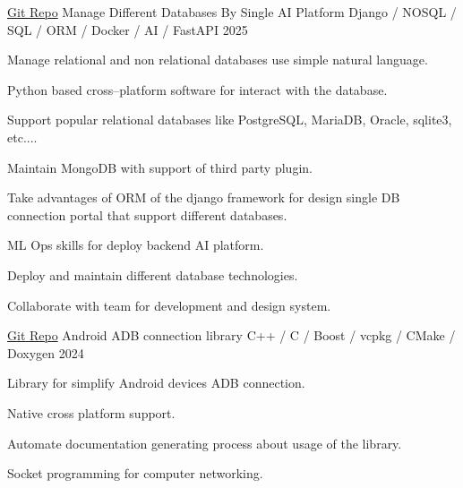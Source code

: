 

\begin{cventries}

  \cventry
    {\href{https://github.com/drsamitha/Demo_DBMS}{Git Repo}} %
    {Manage Different Databases By Single AI Platform} %
    {Django / NOSQL / SQL / ORM / Docker / AI / FastAPI} %
    {2025} %
    {
      \begin{cvitems} %
        \item {Manage relational and non relational databases use simple natural language.}
        \item {Python based cross--platform software for interact with the database.}
        \item {Support popular relational databases like PostgreSQL, MariaDB, Oracle, sqlite3, etc....}
        \item {Maintain MongoDB with support of third party plugin.}
        \item {Take advantages of ORM of the django framework for design single DB connection portal that support different databases.}
        \item {ML Ops skills for deploy backend AI platform.}
        \item {Deploy and maintain different database technologies.}
        \item {Collaborate with team for development and design system.}
      \end{cvitems}
    }

  \cventry
    {\href{https://github.com/drsamitha/adbLib}{Git Repo}} %
    {Android ADB connection library} %
    {C++ / C / Boost / vcpkg / CMake / Doxygen} %
    {2024} %
    {
      \begin{cvitems} %
        \item {Library for simplify Android devices ADB connection.}
        \item {Native cross platform support.}
        \item {Automate documentation generating process about usage of the library.}
        \item {Socket programming for computer networking.}
      \end{cvitems}
    }
    

\end{cventries}
